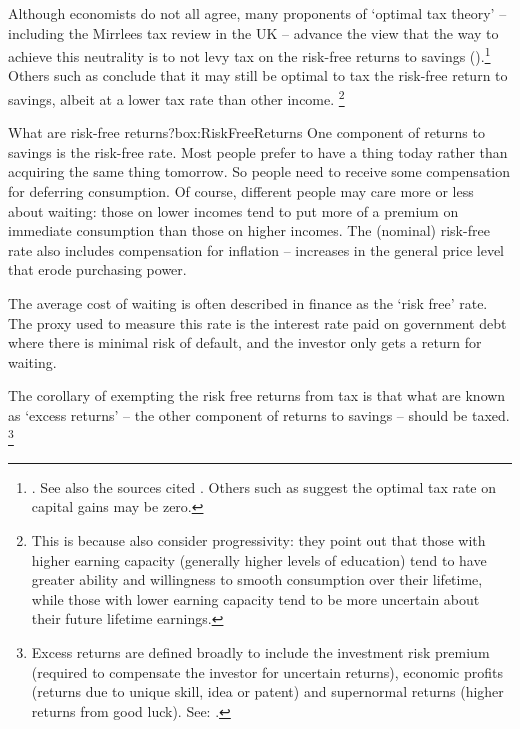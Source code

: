Although economists do not all agree, many proponents of ‘optimal tax theory’ – including the Mirrlees tax review in the UK  – advance the view that the way to achieve this neutrality is to not levy tax on the risk-free returns to savings ().\footnote{\textcite[][284]{MirrleesAdamBesleyEtAl2011}. See also the sources cited \textcite[][2]{Ingles2015}. Others such as \textcite[][1]{Carling2015} suggest the optimal tax rate on capital gains may be zero.} 
Others such as \textcite{BanksDiamond2008}\DEVIATION{} %
conclude that it may still be optimal to tax the risk-free return to savings, albeit at a lower tax rate than other income.%
\footnote{This is because \textcite{BanksDiamond2008} also consider progressivity: they point out that those with higher earning capacity (generally higher levels of education) tend to have greater ability and willingness to smooth consumption over their lifetime, while those with lower earning capacity tend to be more uncertain about their future lifetime earnings.}  

\begin{smallbox}[tbp]{What are risk-free returns?}{box:RiskFreeReturns}
One component of returns to savings is the risk-free rate. Most people prefer to have a thing today rather than acquiring the same thing tomorrow. So people need to receive some compensation for deferring consumption. Of course, different people may care more or less about waiting: those on lower incomes tend to put more of a premium on immediate consumption than those on higher incomes.   The (nominal) risk-free rate also includes compensation for inflation – increases in the general price level that erode purchasing power. 

The average cost of waiting is often described in finance as the ‘risk free’ rate. The proxy used to measure this rate is the interest rate paid on government debt where there is minimal risk of default, and the investor only gets a return for waiting. 
\end{smallbox}

The corollary of exempting the risk free returns from tax is that what are known as ‘excess returns’ – the other component of returns to savings – should be taxed.%
\footnote{Excess returns are defined broadly to include the investment risk premium (required to compensate the investor for uncertain returns), economic profits (returns due to unique skill, idea or patent) and supernormal returns (higher returns from good luck). See: \textcite[][153]{PresidentsAdvisoryPanelTaxReform2005Proposals}.}

